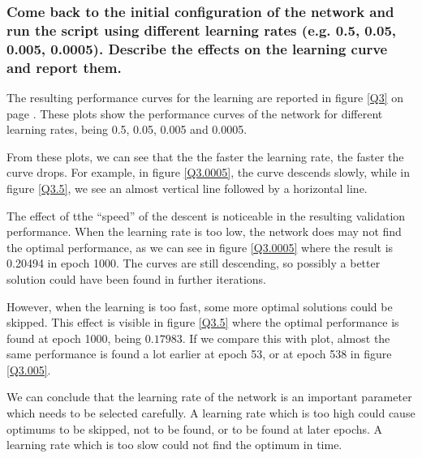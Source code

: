 \documentclass[12pt, a4paper]{article}
\begin{document}
\subsubsection{Come back to the initial configuration of the network and run the script using different learning rates (e.g. 0.5, 0.05, 0.005, 0.0005). Describe the effects on the learning curve and report them.}
The resulting performance curves for the learning are reported in figure \ref{Q3} on page \pageref{Q3}. These plots show the performance curves of the network for different learning rates, being 0.5, 0.05, 0.005 and 0.0005.

From these plots, we can see that the the faster the learning rate, the faster the curve drops. For example, in figure \ref{Q3.0005}, the curve descends slowly, while in figure \ref{Q3.5}, we see an almost vertical line followed by a horizontal line.

The effect of tthe ``speed'' of the descent is noticeable in the resulting validation performance. When the learning rate is too low, the network does may not find the optimal performance, as we can see in figure \ref{Q3.0005} where the result is 0.20494 in epoch 1000. The curves are still descending, so possibly a better solution could have been found in further iterations.

However, when the learning is too fast, some more optimal solutions could be skipped. This effect is visible in figure \ref{Q3.5} where the optimal performance is found at epoch 1000, being $0.17983$. If we compare this with plot, almost the same performance is found a lot earlier at epoch 53, or at epoch 538 in figure \ref{Q3.005}.

We can conclude that the learning rate of the network is an important parameter which needs to be selected carefully. A learning rate which is too high could cause optimums to be skipped, not to be found, or to be found at later epochs. A learning rate which is too slow could not find the optimum in time.
\end{document}
